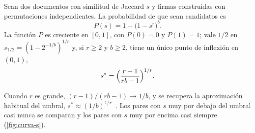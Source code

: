 \begin{proposicion}[Curva en S]\label{prop:curva-s}
Sean dos documentos con similitud de Jaccard $s$ y firmas construidas con permutaciones independientes. La probabilidad de que sean candidatos es
\[
P(s)=1-\bigl(1-s^{r}\bigr)^{b}.
\]
La función $P$ es creciente en $[0,1]$, con $P(0)=0$ y $P(1)=1$; vale $1/2$ en $s_{1/2}=(1-2^{-1/b})^{1/r}$ y, si $r\ge 2$ y $b\ge 2$, tiene un único punto de inflexión en $(0,1)$,
\[
s^{*}=\Bigl(\frac{r-1}{rb-1}\Bigr)^{1/r}.
\]
\end{proposicion}

Cuando $r$ es grande, $(r-1)/(rb-1)\to 1/b$, y se recupera la aproximación habitual del umbral, $s^{*}\approx(1/b)^{1/r}$~\cite[§3.4]{mmds}. Los pares con $s$ muy por debajo del umbral casi nunca se comparan y los pares con $s$ muy por encima casi siempre (\cref{fig:curva-s}).

\addtocounter{figure}{1}%

\addtocounter{definicion}{1}%

